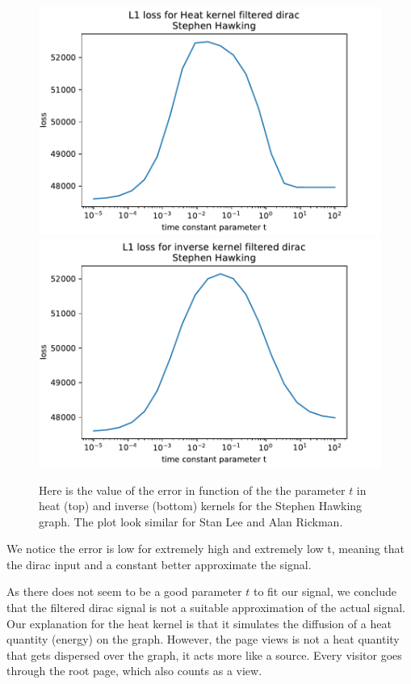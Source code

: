 \documentclass[conference]{IEEEtran}
\begin{document}
\begin{figure}[!htb]
\includegraphics[width=\linewidth]{heat_loss.pdf}
\includegraphics[width=\linewidth]{inverse_loss.pdf}
\caption{Here is the value of the error in function of the the parameter $t$ in heat (top) and inverse (bottom) kernels for the Stephen Hawking graph. The plot look similar for Stan Lee and Alan Rickman. } 
\end{figure}

We notice the error is low for extremely high and extremely low t, meaning that
the dirac input and a constant better approximate the signal.

\medskip

As there does not seem to be a good parameter $t$ to fit our signal, we conclude that the filtered dirac signal is not a suitable approximation of the actual signal. Our explanation for the heat kernel is that it simulates the diffusion of a heat quantity (energy) on the graph. However, the page views is not a heat quantity that gets dispersed over the graph, it acts more like a source. Every visitor goes through the root page, which also counts as a view.
\end{document}
